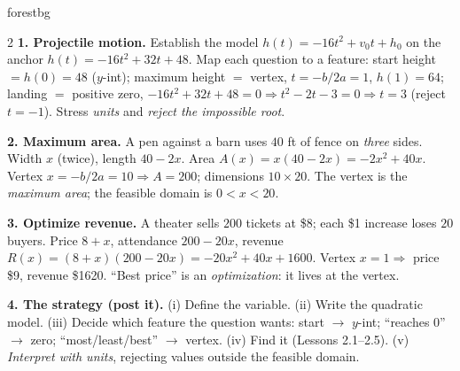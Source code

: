 \documentclass[10pt]{article}
\begin{document}
\begin{skillbox}[Lesson]{forestbg}
\begin{multicols}{2}
\textbf{1. Projectile motion.} Establish the model $h(t)=-16t^2+v_0t+h_0$ on the anchor $h(t)=-16t^2+32t+48$. Map
each question to a feature: start height $=h(0)=48$ ($y$-int); maximum height $=$ vertex, $t=-b/2a=1$, $h(1)=64$;
landing $=$ positive zero, $-16t^2+32t+48=0\Rightarrow t^2-2t-3=0\Rightarrow t=3$ (reject $t=-1$). Stress
\emph{units} and \emph{reject the impossible root}.

\textbf{2. Maximum area.} A pen against a barn uses $40$ ft of fence on \emph{three} sides. Width $x$ (twice),
length $40-2x$. Area $A(x)=x(40-2x)=-2x^2+40x$. Vertex $x=-b/2a=10\Rightarrow A=200$; dimensions $10\times20$.
The vertex is the \emph{maximum area}; the feasible domain is $0<x<20$.

\columnbreak

\textbf{3. Optimize revenue.} A theater sells $200$ tickets at \$8; each \$1 increase loses $20$ buyers. Price
$8+x$, attendance $200-20x$, revenue $R(x)=(8+x)(200-20x)=-20x^2+40x+1600$. Vertex $x=1\Rightarrow$ price \$9,
revenue \$1620. ``Best price'' is an \emph{optimization}: it lives at the vertex.

\textbf{4. The strategy (post it).} (i) Define the variable. (ii) Write the quadratic model. (iii) Decide which
feature the question wants: start $\to$ $y$-int; ``reaches $0$'' $\to$ zero; ``most/least/best'' $\to$ vertex.
(iv) Find it (Lessons 2.1--2.5). (v) \emph{Interpret with units}, rejecting values outside the feasible domain.
\end{multicols}
\end{skillbox}
\end{document}
